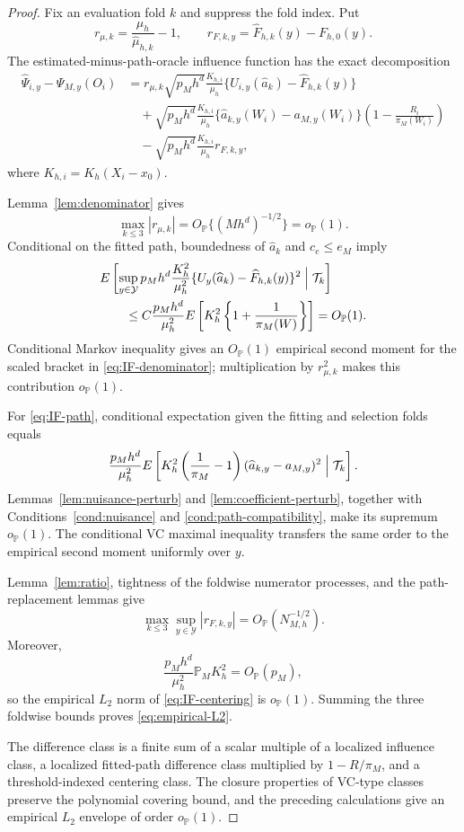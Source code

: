 \begin{proof}
Fix an evaluation fold \(k\) and suppress the fold index. Put
\[
r_{\mu,k}=\frac{\mu_h}{\widehat\mu_{h,k}}-1,
\qquad
r_{F,k,y}=\widehat F_{h,k}(y)-F_{h,0}(y).
\]
The estimated-minus-path-oracle influence function has the exact decomposition
\begin{align}
\widehat\Psi_{i,y}-\Psi_{M,y}(O_i)
&=
r_{\mu,k}
\sqrt{p_Mh^d}\frac{K_{h,i}}{\mu_h}
\{U_{i,y}(\widehat a_k)-\widehat F_{h,k}(y)\}
\label{eq:IF-denominator}\\
&\quad+
\sqrt{p_Mh^d}\frac{K_{h,i}}{\mu_h}
\{\widehat a_{k,y}(W_i)-a_{M,y}(W_i)\}
\left(1-\frac{R_i}{\pi_M(W_i)}\right)
\label{eq:IF-path}\\
&\quad-
\sqrt{p_Mh^d}\frac{K_{h,i}}{\mu_h}
r_{F,k,y},
\label{eq:IF-centering}
\end{align}
where \(K_{h,i}=K_h(X_i-x_0)\).

Lemma~\ref{lem:denominator} gives
\[
\max_{k\le3}|r_{\mu,k}|
=O_{\mathbb P}\{(Mh^d)^{-1/2}\}
=o_{\mathbb P}(1).
\]
Conditional on the fitted path, boundedness of \(\widehat a_k\) and \(c_e\le e_M\) imply
\begin{align*}
&E\left[
\sup_{y\in\mathcal Y}
 p_Mh^d\frac{K_h^2}{\mu_h^2}
 \{U_y(\widehat a_k)-\widehat F_{h,k}(y)\}^2
\Bigm|\mathcal T_k
\right]\\
&\qquad\le
C\frac{p_Mh^d}{\mu_h^2}
E\left[K_h^2\left\{1+\frac1{\pi_M(W)}\right\}\right]
=O_{\mathbb P}(1).
\end{align*}
Conditional Markov inequality gives an \(O_{\mathbb P}(1)\) empirical second moment for the scaled bracket in \eqref{eq:IF-denominator}; multiplication by \(r_{\mu,k}^2\) makes this contribution \(o_{\mathbb P}(1)\).

For \eqref{eq:IF-path}, conditional expectation given the fitting and selection folds equals
\[
\frac{p_Mh^d}{\mu_h^2}
E\left[
K_h^2
\left(\frac1{\pi_M}-1\right)
(\widehat a_{k,y}-a_{M,y})^2
\Bigm|\mathcal T_k
\right].
\]
Lemmas~\ref{lem:nuisance-perturb} and \ref{lem:coefficient-perturb}, together with Conditions~\ref{cond:nuisance} and \ref{cond:path-compatibility}, make its supremum \(o_{\mathbb P}(1)\). The conditional VC maximal inequality transfers the same order to the empirical second moment uniformly over \(y\).

Lemma~\ref{lem:ratio}, tightness of the foldwise numerator processes, and the path-replacement lemmas give
\[
\max_{k\le3}\sup_{y\in\mathcal Y}|r_{F,k,y}|
=O_{\mathbb P}(N_{M,h}^{-1/2}).
\]
Moreover,
\[
\frac{p_Mh^d}{\mu_h^2}\mathbb P_MK_h^2
=O_{\mathbb P}(p_M),
\]
so the empirical \(L_2\) norm of \eqref{eq:IF-centering} is \(o_{\mathbb P}(1)\). Summing the three foldwise bounds proves \eqref{eq:empirical-L2}.

The difference class is a finite sum of a scalar multiple of a localized influence class, a localized fitted-path difference class multiplied by \(1-R/\pi_M\), and a threshold-indexed centering class. The closure properties of VC-type classes preserve the polynomial covering bound, and the preceding calculations give an empirical \(L_2\) envelope of order \(o_{\mathbb P}(1)\).
\end{proof}

